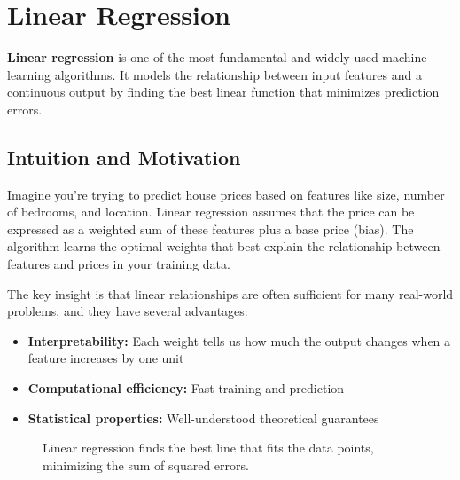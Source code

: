 
\section{Linear Regression }
\label{sec:linear-regression}

\textbf{Linear regression} is one of the most fundamental and widely-used machine learning algorithms. It models the relationship between input features and a continuous output by finding the best linear function that minimizes prediction errors.

\subsection{Intuition and Motivation}

Imagine you're trying to predict house prices based on features like size, number of bedrooms, and location. Linear regression assumes that the price can be expressed as a weighted sum of these features plus a base price (bias). The algorithm learns the optimal weights that best explain the relationship between features and prices in your training data.

The key insight is that linear relationships are often sufficient for many real-world problems, and they have several advantages:
\begin{itemize}
    \item \textbf{Interpretability:} Each weight tells us how much the output changes when a feature increases by one unit
    \item \textbf{Computational efficiency:} Fast training and prediction
    \item \textbf{Statistical properties:} Well-understood theoretical guarantees
\end{itemize}

\begin{figure}[htbp]
\centering
{}
\caption{Linear regression finds the best line that fits the data points, minimizing the sum of squared errors.}
\label{fig:linear-regression-example}
\end{figure}

